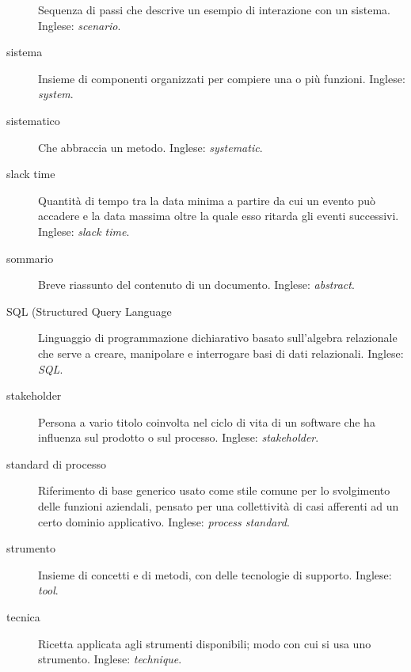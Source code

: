 \documentclass[a4paper]{article}
\begin{document}
\begin{description}
			Sequenza di passi che descrive un esempio di interazione con un sistema. Inglese: \emph{scenario}.
			
	\item[sistema] 

			Insieme di componenti organizzati per compiere una o più funzioni. Inglese: \emph{system}.
			
	\item[sistematico] 

			Che abbraccia un metodo. Inglese: \emph{systematic}.
			
	\item[slack time] 

			Quantità di tempo tra la data minima a partire da cui un evento può accadere e la data massima oltre la quale esso ritarda gli eventi successivi. Inglese: \emph{slack time}.
			
	\item[sommario] 

			Breve riassunto del contenuto di un documento. Inglese: \emph{abstract}.
			
	\item[SQL (Structured Query Language] 

			Linguaggio di programmazione dichiarativo basato sull'algebra relazionale che serve a creare, manipolare e interrogare basi di dati relazionali. Inglese: \emph{SQL}.
			
	\item[stakeholder] 

			Persona a vario titolo coinvolta nel ciclo di vita di un software che ha influenza sul prodotto o sul processo. Inglese: \emph{stakeholder}.
			
	\item[standard di processo] 

			Riferimento di base generico usato come stile comune per lo svolgimento delle funzioni aziendali, pensato per una collettività di casi afferenti ad un certo dominio applicativo. Inglese: \emph{process standard}.
			
	\item[strumento] 

			Insieme di concetti e di metodi, con delle tecnologie di supporto. Inglese: \emph{tool}.
			
	\item[tecnica] 

			Ricetta applicata agli strumenti disponibili; modo con cui si usa uno strumento. Inglese: \emph{technique}.
			

\end{description}
\end{document}
